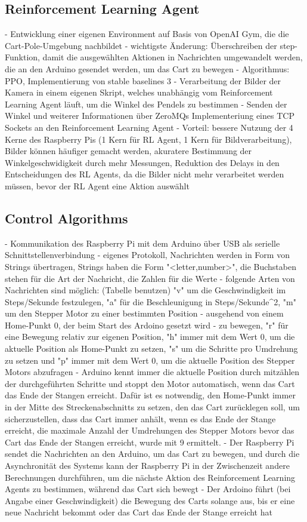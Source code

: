 \subsection{Reinforcement Learning Agent}
- Entwicklung einer eigenen Environment auf Basis von OpenAI Gym, die die Cart-Pole-Umgebung nachbildet
- wichtigste Änderung: Überschreiben der step-Funktion, damit die ausgewählten Aktionen in Nachrichten umgewandelt werden, die an den Arduino gesendet werden, um das Cart zu bewegen
- Algorithmus: PPO, Implementierung von stable baselines 3
- Verarbeitung der Bilder der Kamera in einem eigenen Skript, welches unabhängig vom Reinforcement Learning Agent läuft, um die Winkel des Pendels zu bestimmen
- Senden der Winkel und weiterer Informationen über ZeroMQs Implementeriung eines TCP Sockets an den Reinforcement Learning Agent
- Vorteil: bessere Nutzung der 4 Kerne des Raspberry Pis (1 Kern für RL Agent, 1 Kern für Bildverarbeitung), Bilder können häufiger gemacht werden, akuratere Bestimmung der Winkelgeschwidigkeit durch mehr Messungen, Reduktion des Delays in den Entscheidungen des RL Agents, da die Bilder nicht mehr verarbeitet werden müssen, bevor der RL Agent eine Aktion auswählt

\subsection{Control Algorithms}
- Kommunikation des Raspberry Pi mit dem Arduino über USB als serielle Schnittstellenverbindung
- eigenes Protokoll, Nachrichten werden in Form von Strings übertragen, Strings haben die Form "<letter,number>", die Buchstaben stehen für die Art der Nachricht, die Zahlen für die Werte
- folgende Arten von Nachrichten sind möglich: (Tabelle benutzen) "v" um die Geschwindigkeit im Steps/Sekunde festzulegen, "a" für die Beschleunigung in Steps/Sekunde^2, "m" um den Stepper Motor zu einer bestimmten Position - ausgehend von einem Home-Punkt 0, der beim Start des Ardoino gesetzt wird - zu bewegen, "r" für eine Bewegung relativ zur eigenen Position, "h" immer mit dem Wert 0, um die aktuelle Position als Home-Punkt zu setzen, "s" um die Schritte pro Umdrehung zu setzen und "p" immer mit dem Wert 0, um die aktuelle Position des Stepper Motors abzufragen
- Arduino kennt immer die aktuelle Position durch mitzählen der durchgeführten Schritte und stoppt den Motor automatisch, wenn das Cart das Ende der Stangen erreicht. Dafür ist es notwendig, den Home-Punkt immer in der Mitte des Streckenabschnitts zu setzen, den das Cart zurücklegen soll, um sicherzustellen, dass das Cart immer anhält, wenn es das Ende der Stange erreicht, die maximale Anzahl der Umdrehungen des Stepper Motors bevor das Cart das Ende der Stangen erreicht, wurde mit 9 ermittelt.
- Der Raspberry Pi sendet die Nachrichten an den Arduino, um das Cart zu bewegen, und durch die Asynchronität des Systems kann der Raspberry Pi in der Zwischenzeit andere Berechnungen durchführen, um die nächste Aktion des Reinforcement Learning Agents zu bestimmen, während das Cart sich bewegt
- Der Ardoino führt (bei Angabe einer Geschwindigkeit) die Bewegung des Carts solange aus, bis er eine neue Nachricht bekommt oder das Cart das Ende der Stange erreicht hat

